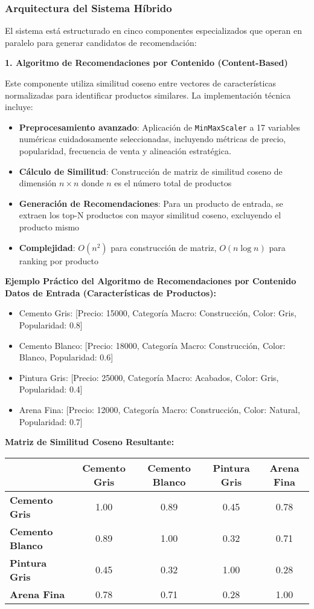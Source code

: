 \documentclass[twocolumn]{article}
\begin{document}
\subsubsection{Arquitectura del Sistema Híbrido}

El sistema está estructurado en cinco componentes especializados que operan en paralelo para generar candidatos de recomendación:

\textbf{1. Algoritmo de Recomendaciones por Contenido (Content-Based)}

Este componente utiliza similitud coseno entre vectores de características normalizadas para identificar productos similares. La implementación técnica incluye:

\begin{itemize}
    \item          \textbf{Preprocesamiento avanzado}: Aplicación de \texttt{MinMaxScaler} a 17 variables numéricas cuidadosamente seleccionadas, incluyendo métricas de precio, popularidad, frecuencia de venta y alineación estratégica. 
    \item \textbf{Cálculo de Similitud}: Construcción de matriz de similitud coseno de dimensión \(n \times n\) donde \(n\) es el número total de productos
    \item \textbf{Generación de Recomendaciones}: Para un producto de entrada, se extraen los top-N productos con mayor similitud coseno, excluyendo el producto mismo
    \item \textbf{Complejidad}: \(O(n^2)\) para construcción de matriz, \(O(n \log n)\) para ranking por producto
\end{itemize}
\textbf{Ejemplo Práctico del Algoritmo de Recomendaciones por Contenido}
\textbf{Datos de Entrada (Características de Productos):}
\begin{itemize}
\item Cemento Gris: [Precio: 15000, Categoría Macro: Construcción, Color: Gris, Popularidad: 0.8]
\item Cemento Blanco: [Precio: 18000, Categoría Macro: Construcción, Color: Blanco, Popularidad: 0.6]
\item Pintura Gris: [Precio: 25000, Categoría Macro: Acabados, Color: Gris, Popularidad: 0.4]
\item Arena Fina: [Precio: 12000, Categoría Macro: Construcción, Color: Natural, Popularidad: 0.7]
\end{itemize}
\textbf{Matriz de Similitud Coseno Resultante:}
\begin{table}[H]
\centering
\scriptsize
\begin{tabular}{|l|c|c|c|c|}
\hline
 & \textbf{Cemento Gris} & \textbf{Cemento Blanco} & \textbf{Pintura Gris } & \textbf{Arena Fina} \\
\hline
\textbf{Cemento Gris}   & 1.00 & 0.89 & 0.45 & 0.78 \\
\hline
\textbf{Cemento Blanco} & 0.89 & 1.00 & 0.32 & 0.71 \\
\hline
\textbf{Pintura Gris}   & 0.45 & 0.32 & 1.00 & 0.28 \\
\hline
\textbf{Arena Fina}     & 0.78 & 0.71 & 0.28 & 1.00 \\
\hline
\end{tabular}
\end{table}
\end{document}
